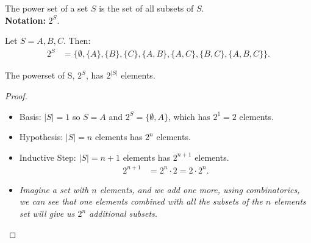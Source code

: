 \begin{definition}
    The power set of a set $S$ is the set of all subsets of $S$. \\
    \textbf{Notation:} $2^S$.
\end{definition}

\begin{example}
    Let $S = {A, B, C}$. Then:
    \begin{align}
        2^S & = \{\emptyset, \{A\}, \{B\}, \{C\}, \{A, B\}, \{A, C\}, \{B, C\}, \{A, B, C\}\}.
    \end{align}
\end{example}

\begin{claim}
    The powerset of S, $2^S$, has $2^{|S|}$ elements.
\end{claim}
\begin{proof}
    \begin{itemize}
        \item Basis: $|S| = 1$ so $S = {A}$ and $2^S = \{\emptyset, A\}$, which has $2^1 = 2$ elements.
        \item Hypothesis: $|S| = n$ elements has $2^n$ elements.
        \item Inductive Step: $|S| = n+1$ elements has $2^{n+1}$ elements.
              \begin{align*}
                  2^{n+1} & = 2^n \cdot 2 = 2 \cdot 2^n.
              \end{align*}
        \item[] \textit{Imagine a set with $n$ elements, and we add one more, using combinatorics, we can see that one elements combined with all the subsets of the $n$ elements set will give us $2^n$ additional subsets.}
    \end{itemize}
\end{proof}

